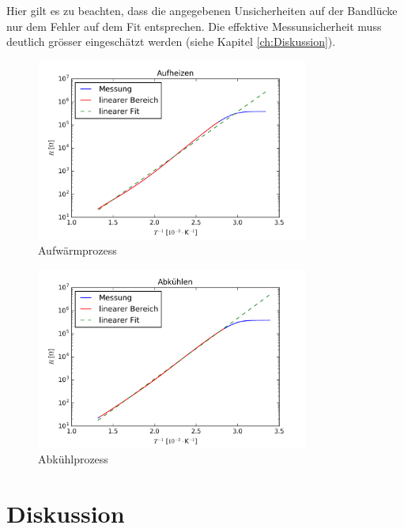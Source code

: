 \documentclass[a4paper,parskip,11pt, DIV12]{scrreprt}
\begin{document}
Hier gilt es zu beachten, dass die angegebenen Unsicherheiten auf der Bandlücke nur dem Fehler auf dem Fit entsprechen. Die effektive Messunsicherheit muss deutlich grösser eingeschätzt werden (siehe Kapitel \ref{ch:Diskussion}).

\begin{figure}[h]
\centering
    	\includegraphics[width=0.8\textwidth]{temp_heat.png}
	\caption{Aufwärmprozess}
	\label{temp_heat}
\end{figure}

\begin{figure}[h]
\centering
    	\includegraphics[width=0.8\textwidth]{temp_cool.png}
	\caption{Abkühlprozess}
	\label{temp_cool}
\end{figure}

\clearpage

\chapter{Diskussion}
\end{document}

